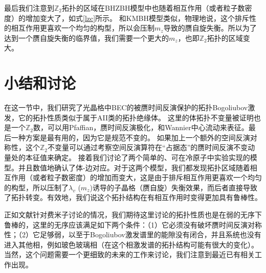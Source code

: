 最后我们注意到$\mathbb Z_2$拓扑的区域在BHZBH模型中也随着相互作用（或者粒子数密度）的增加变大了，如式\eqref{lzc}所示。
和KMBH模型类似，物理地说，这个排斥性的相互作用更喜欢一个均匀的构型，所以会压制$m_z$导致的赝自旋失衡。所以为了达到一个赝自旋失衡的临界值，我们需要一个更大的$m_z$，也即$\mathbb Z_2$拓扑的区域变大。

\section{小结和讨论}\label{sec5}
在这一节中，我们研究了光晶格中BEC的被赝时间反演保护的拓扑Bogoliubov激发，它的拓扑性质类似于属于AII类的拓扑绝缘体。
这里的体拓扑不变量被证明也是一个$\mathbb Z_2$数，可以用Pfaffian，赝时间反演极化，和Wannier中心流动来表征。最后一种方案是最有用的，因为它是规范不变的。
如果加上一个额外的空间反演对称性，这个$\mathbb Z_2$不变量可以通过考察空间反演算符在“占据态”的赝时间反演不变动量处的本征值来确定。
接着我们讨论了两个简单的、可在冷原子中实验实现的模型。并且数值地确认了体-边对应。对于这两个模型，我们都发现拓扑区域随着相互作用（或者粒子数密度）的增加而变大，这是由于排斥相互作用更喜欢一个均匀的构型，所以压制了$\lambda_v$ ($m_z$)诱导的子晶格（赝自旋）失衡效果，而后者直接导致了拓扑转变。有效地，我们说这个拓扑结构在有相互作用时变得更加具有鲁棒性。

正如文献\cite{ShunQingShen}针对费米子讨论的情况，我们期待这里讨论的拓扑性质也是在弱的无序下鲁棒的，这里的无序应该满足如下两个条件：（1）它必须没有破坏赝时间反演对称性；（2）它足够弱，以至于Bogoliubov激发谱里的能隙没有闭合，并且系统也没有进入其他相，例如玻色玻璃相（在这个相激发谱的拓扑结构可能有很大的变化）。当然，这个问题需要一个更细致的未来的工作来讨论，我们注意到最近已有相关工作出现\cite{Akagi2020}。

